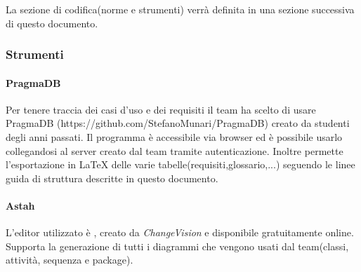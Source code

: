 		La sezione di codifica(norme e strumenti) verrà definita in una sezione successiva di questo documento.
	\subsubsection{Strumenti}
		\paragraph{PragmaDB}
		Per tenere traccia dei casi d'uso e dei requisiti il team ha scelto di usare PragmaDB (https://github.com/StefanoMunari/PragmaDB) creato da studenti degli anni passati. Il programma è accessibile via browser ed è possibile usarlo collegandosi al server creato dal team tramite autenticazione. Inoltre permette l'esportazione in \LaTeX{} delle varie tabelle(requisiti,glossario,...) seguendo le linee guida di struttura descritte in questo documento.
		\paragraph{Astah}
		L'editor  utilizzato è , creato da \textit{ChangeVision} e disponibile gratuitamente online. Supporta la generazione di tutti i diagrammi che vengono usati dal team(classi, attività, sequenza e package).


